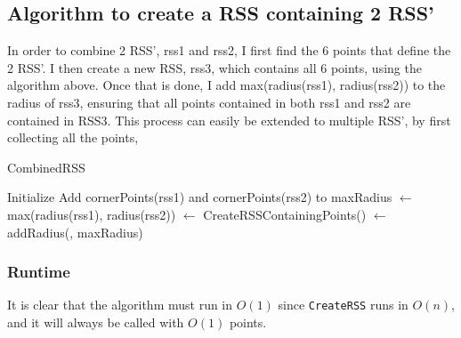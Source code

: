 \subsection{Algorithm to create a RSS containing 2 RSS'}
In order to combine  2 RSS', rss1 and rss2, I first find the 6 points that define the 2 RSS'. I then create a new RSS, rss3, which contains all 6 points, using the algorithm above. Once that is done, I add  max(radius(rss1), radius(rss2)) to the radius of rss3, ensuring that all points contained in both rss1 and rss2 are contained in RSS3. This process can easily be extended to multiple RSS', by first collecting all the points, 

\begin{algorithm}[H]
  \caption{CombinedRSS}
   
  \dontprintsemicolon
  Initialize \points \;
  Add cornerPoints(rss1) and cornerPoints(rss2) to \points \;
  maxRadius $\gets$ max(radius(rss1), radius(rss2)) \;
  \crss $\gets$ CreateRSSContainingPoints(\points) \;
  \crss $\gets$ addRadius(\crss, maxRadius) \;
  \return \crss
\end{algorithm}

\subsubsection{Runtime}
It is clear that the algorithm must run in $O(1)$ since \texttt{CreateRSS} runs in $O(n)$, and it will always be called with $O(1)$ points.


